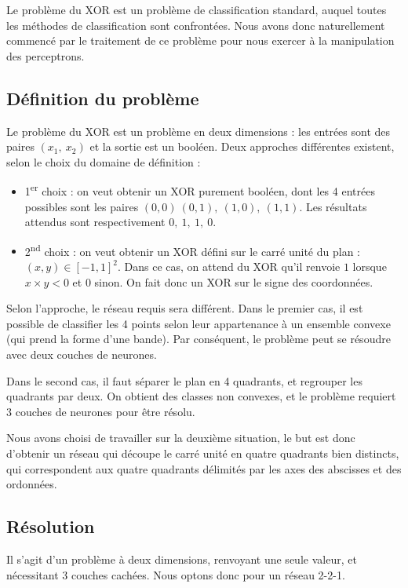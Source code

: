 Le problème du XOR est un problème de classification standard, auquel toutes les méthodes de classification sont confrontées. Nous avons donc naturellement commencé par le traitement de ce problème pour nous exercer à la manipulation des perceptrons.

\subsection{Définition du problème}

Le problème du XOR est un problème en deux dimensions : les entrées sont des paires $(x_1,\ x_2)$ et la sortie est un booléen. Deux approches différentes existent, selon le choix du domaine de définition : 

\begin{itemize}
  \item 1\textsuperscript{er} choix : on veut obtenir un XOR purement booléen, dont les 4 entrées possibles sont les paires $(0,0)\ (0,1),\ (1,0),\ (1,1)$. Les résultats attendus sont respectivement $0,\ 1,\ 1,\ 0$.
  \item 2\textsuperscript{nd} choix : on veut obtenir un XOR défini sur le carré unité du plan : ${(x,y) \in [-1,1]^2}$. Dans ce cas, on attend du XOR qu'il renvoie $1$ lorsque $x \times y < 0$ et $0$ sinon. On fait donc un XOR sur le signe des coordonnées.
\end{itemize}

Selon l'approche, le réseau requis sera différent. Dans le premier cas, il est possible de classifier les 4 points selon leur appartenance à un ensemble convexe (qui prend la forme d'une bande). Par conséquent, le problème peut se résoudre avec deux couches de neurones.

Dans le second cas, il faut séparer le plan en 4 quadrants, et regrouper les quadrants par deux. On obtient des classes non convexes, et le problème requiert 3 couches de neurones pour être résolu.

Nous avons choisi de travailler sur la deuxième situation, le but est donc d'obtenir un réseau qui découpe le carré unité en quatre quadrants bien distincts, qui correspondent aux quatre quadrants délimités par les axes des abscisses et des ordonnées.

\subsection{Résolution}
\label{subsec:XOR_Résolution}


Il s'agit d'un problème à deux dimensions, renvoyant une seule valeur, et nécessitant 3 couches cachées. Nous optons donc pour un réseau 2-2-1. 

